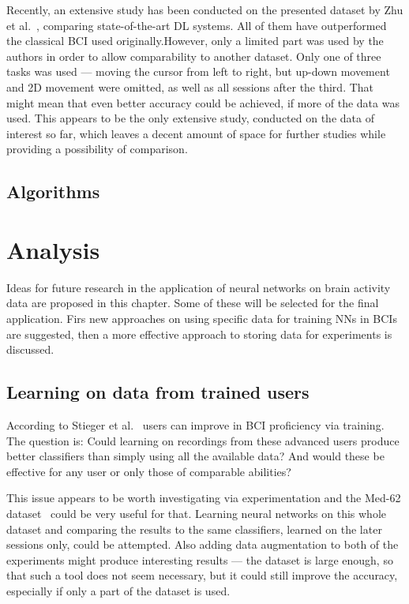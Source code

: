 \documentclass[english,BP]{thesiskiv}
\begin{document}
	Recently, an extensive study has been conducted on the presented dataset by Zhu et al.~\cite{zhu:dl:bci:mi:22}, comparing state-of-the-art DL systems. All of them have outperformed the classical BCI used originally.\@ However, only a limited part was used by the authors in order to allow comparability to another dataset. Only one of three tasks was used --- moving the cursor from left to right, but up-down movement and 2D movement were omitted, as well as all sessions after the third.
	That might mean that even better accuracy could be achieved, if more of the data was used.
	This appears to be the only extensive study, conducted on the data of interest so far, which leaves a decent amount of space for further studies while providing a possibility of comparison.


	\section{Algorithms}


\chapter{Analysis}

Ideas for future research in the application of neural networks on brain activity data are proposed in this chapter. Some of these will be selected for the final application. Firs new approaches on using specific data for training NNs in BCIs are suggested, then a more effective approach to storing data for experiments is discussed.

	\section{Learning on data from trained users}

	According to Stieger et al.~\cite{stieger:data:21,stieger:mindfulness:20} users can improve in BCI proficiency via training. The question is: Could learning on recordings from these advanced users produce better classifiers than simply using all the available data? And would these be effective for any user or only those of comparable abilities?
	
	This issue appears to be worth investigating via experimentation and the Med-62 dataset~\cite{stieger:data:21} could be very useful for that. Learning neural networks on this whole dataset and comparing the results to the same classifiers, learned on the later sessions only, could be  attempted. Also adding data augmentation to both of the experiments might produce interesting results --- the dataset is large enough, so that such a tool does not seem necessary, but it could still improve the accuracy, especially if only a part of the dataset is used.
\end{document}

